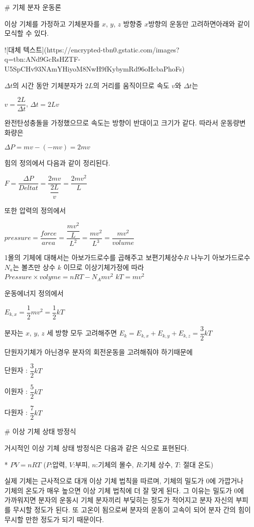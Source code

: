 # 기체 분자 운동론

이상 기체를 가정하고 기체분자를 $x$, $y$, $z$ 방향중 $x$방향의 운동만 고려하면아래와 같이 모식할 수 있다.

![대체 텍스트](https://encrypted-tbn0.gstatic.com/images?q=tbn:ANd9GcRsHZTF-U5SpCHv93NAmYHiyoM8NwH9fKybymRd96oHcbaPhoFs)

$\Delta t$의 시간 동안 기체분자가 $2L$의 거리를 움직이므로 속도 $v$와 $\Delta t$는

$ v = \dfrac{2L}{\Delta t} $, $\Delta t = {2L}{v}$

완전탄성충돌을 가정했으므로 속도는 방향이 반대이고 크기가 같다. 따라서 운동량변화량은 

$\Delta P = mv - (-mv) = 2mv$

힘의 정의에서 다음과 같이 정리된다.

$F = \dfrac{\Delta P}{Delta t} = \dfrac{2mv}{\dfrac{2L}{v}} = \dfrac{2mv^2}{L}$

또한 압력의 정의에서

$ pressure = \dfrac{force}{area} = \dfrac{\dfrac{mv^2}{L}}{L^2} = \dfrac{mv^2}{L^3} = \dfrac {mv^2}{volume}$

1몰의 기체에 대해서는 아보가드로수를 곱해주고 보편기체상수$R$ 나누기 아보가드로수 $N_a$는 볼츠만 상수 $k$ 이므로 이상기체가정에 따라
$Pressure \times volyme = nRT - N_{A} mv^2$
$kT = mv^2$

운동에너지 정의에서

$E_{k, x} = \dfrac{1}{2} mv^2 = \dfrac{1}{2} kT$

분자는 $x$, $y$, $z$ 세 방향 모두 고려해주면
$E_{k} = E_{k, x} + E_{k, y} + E_{k, z} = \dfrac{3}{2} kT$

단원자기체가 아닌경우 분자의 회전운동을 고려해줘야 하기때문에

단원자 : $\dfrac{3}{2} kT$

이원자 : $\dfrac{5}{2} kT$

다원자 : $\dfrac{7}{2} kT$



# 이상 기체 상태 방정식

거시적인 이상 기체 상태 방정식은 다음과 같은 식으로 표현된다. 

*  $ PV = nRT $
($P$:압력, $V$:부피, $n$:기체의 몰수, $R$:기체 상수, $T$: 절대 온도)

실제 기체는 근사적으로 대개 이상 기체 법칙을 따르며, 기체의 밀도가 0에 가깝거나 기체의 온도가 매우 높으면 이상 기체 법칙에 더 잘 맞게 된다. 그 이유는 밀도가 0에 가까워지면 분자의 운동시 기체 분자끼리 부딪히는 정도가 적어지고 분자 자신의 부피를 무시할 정도가 된다. 또 고온이 됨으로써 분자의 운동이 고속이 되어 분자 간의 힘이 무시할 만한 정도가 되기 때문이다.

